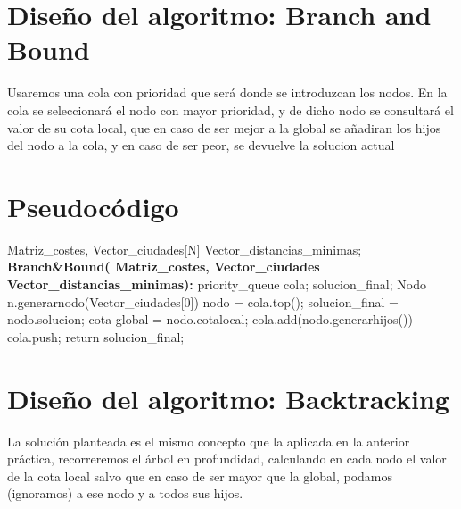 	
	
	
	\section{Diseño del algoritmo: Branch and Bound} 


		
		Usaremos una cola con prioridad que será donde se introduzcan los nodos.
		En la cola se seleccionará el nodo con mayor prioridad, y de dicho nodo se consultará el valor de su cota local, que en caso de ser mejor a la global se añadiran los hijos del nodo a la cola, y en caso de ser peor, se devuelve la solucion actual
		
		

	\section{Pseudocódigo}
	


		\footnotesize{	
			\begin{algorithmic}				
				\Require Matriz\_costes, Vector\_ciudades[N] Vector\_distancias\_minimas; 
				\State \textbf{Branch\&Bound( Matriz\_costes, Vector\_ciudades Vector\_distancias\_minimas):}
				\State priority\_queue cola;
				\State solucion\_final;
				\State	 Nodo n.generarnodo(Vector\_ciudades[0])
				\State nodo = cola.top();
				\State solucion\_final = nodo.solucion;
				\State cota global = nodo.cotalocal;
				\EndIf
				\State cola.add(nodo.generarhijos())
				\State cola.push;
				\Else
				\State return solucion\_final;
				
				\EndIf
				
				\EndWhile
				
				
				
			\end{algorithmic}	
		}

	
	\section{Diseño del algoritmo: Backtracking} 


		
		La solución planteada es el mismo concepto que la aplicada en la anterior práctica, recorreremos el árbol en profundidad, calculando en cada nodo el valor de la cota local salvo que en caso de ser mayor que la global, podamos (ignoramos) a ese nodo y a todos sus hijos.
		
